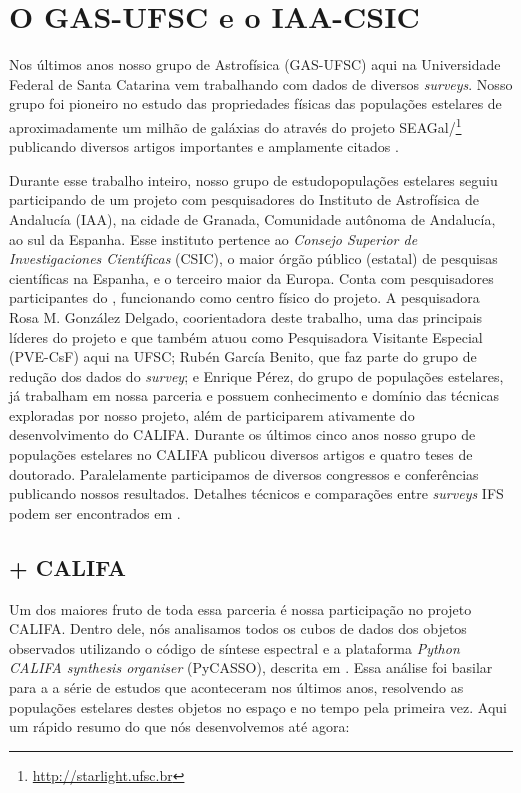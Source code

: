 \section{O GAS-UFSC e o IAA-CSIC}
\label{sec:intro:UFSCeIAA}

Nos últimos anos nosso grupo de Astrofísica (GAS-UFSC) aqui na Universidade Federal de Santa Catarina vem trabalhando com dados de diversos {\em surveys}. Nosso grupo foi pioneiro no estudo das propriedades físicas das populações estelares de aproximadamente um milhão de galáxias do \SDSS através do projeto SEAGal/\starlight\footnote{\href{http://starlight.ufsc.br}{http://starlight.ufsc.br}} publicando diversos artigos importantes e amplamente citados \citep[e.g., ][]{CidFernandes.etal.2005a, Mateus.etal.2006a, Stasinska.etal.2006a, Asari.etal.2007a, Stasinska.etal.2008a, CidFernandes.etal.2011a}.

Durante esse trabalho inteiro, nosso grupo de estudopopulações estelares seguiu participando de um projeto com pesquisadores do Instituto de Astrofísica de Andalucía (IAA), na cidade de Granada, Comunidade autônoma de Andalucía, ao sul da Espanha. Esse instituto pertence ao {\em Consejo Superior de Investigaciones Científicas} (CSIC), o maior órgão público (estatal) de pesquisas científicas na Espanha, e o terceiro maior da Europa. Conta com pesquisadores participantes do \CALS, funcionando como centro físico do projeto. A pesquisadora Rosa M. González Delgado, coorientadora deste trabalho, uma das principais líderes do projeto e que também atuou como Pesquisadora Visitante Especial (PVE-CsF) aqui na UFSC; Rubén García Benito, que faz parte do grupo de redução dos dados do {\em survey}; e Enrique Pérez, do grupo de populações estelares, já trabalham em nossa parceria e possuem conhecimento e domínio das técnicas exploradas por nosso projeto, além de participarem ativamente do desenvolvimento do CALIFA. Durante os últimos cinco anos nosso grupo de populações estelares no CALIFA publicou diversos artigos e quatro teses de doutorado. Paralelamente participamos de diversos congressos e conferências publicando nossos resultados. Detalhes técnicos e comparações entre {\em surveys} IFS podem ser encontrados em \citet{Andre2015}.

\subsection{\starlight + CALIFA}
\label{sec:intro:UFSCeIAA:SLCAL}
Um dos maiores fruto de toda essa parceria é nossa participação no projeto CALIFA. Dentro dele, nós analisamos todos os cubos de dados dos objetos observados utilizando o código de síntese espectral \starlight e a plataforma {\em Python CALIFA \starlight synthesis organiser} (PyCASSO), descrita em \citet{CidFernandes.etal.2013a, CidFernandes.etal.2014a}. Essa análise foi basilar para a a série de estudos que aconteceram nos últimos anos, resolvendo as populações estelares destes objetos no espaço e no tempo pela primeira vez. Aqui um rápido resumo do que nós desenvolvemos até agora:

